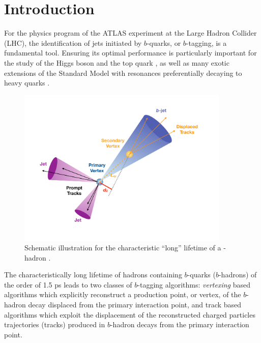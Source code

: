 \section{Introduction}
\label{sec:ftag-intro}

For the physics program of the ATLAS experiment at the Large Hadron Collider (LHC), the identification of jets initiated by $b$-quarks, or $b$-tagging, is a fundamental tool. 
Ensuring its optimal performance is particularly important for the study of the Higgs boson and the top quark \cite{HIGG-2018-04, HIGG-2018-13}, as well as many exotic extensions of the Standard Model with resonances preferentially decaying to heavy quarks \cite{ATLASdijetres}. 


\begin{figure}[htbp]
  \centering
  \includegraphics[width=0.9\textwidth]{figures/ftag/b-trig-paper/fig_01}
  \caption{Schematic illustration for the characteristic ``long'' lifetime of a \Pqb-hadron \cite{b-trig-paper}. }
  \label{fig:b-jet-graphic}
\end{figure}

The characteristically long lifetime of hadrons containing $b$-quarks ($b$-hadrons) of the order of 1.5 ps \cite{PDG} leads to two classes of $b$-tagging algorithms: \textit{vertexing} based algorithms which explicitly reconstruct a production point, or vertex, of the $b$-hadron decay displaced from the primary interaction point, and track based algorithms which exploit the displacement of the reconstructed charged particles trajectories (tracks) produced in $b$-hadron decays from the primary interaction point.



